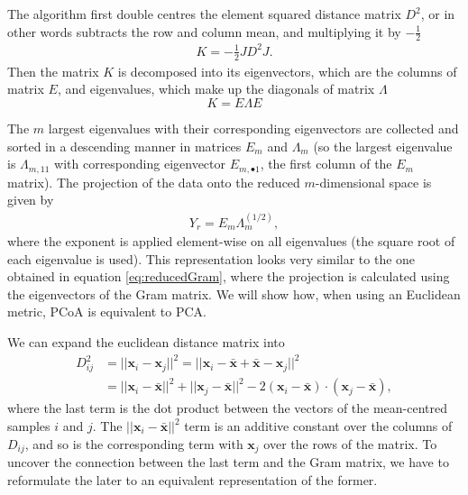 The algorithm first double centres the element squared distance matrix $D^2$, or in other words subtracts the row and column mean, and multiplying it by $-\frac{1}{2}$
\begin{align}
\label{eq:Kmatrix}
K = -\frac{1}{2}JD^2J.
\end{align}
Then the matrix $K$ is decomposed into its eigenvectors, which are the columns of matrix $E$, and eigenvalues, which make up the diagonals of matrix $\Lambda$
\begin{equation}
    K = E\Lambda E
\end{equation}

The $m$ largest eigenvalues with their corresponding eigenvectors are collected and sorted in a descending manner in matrices $E_m$ and $\Lambda_m$ (so the largest eigenvalue is $\Lambda_{m,11}$ with corresponding eigenvector $E_{m,{ \bullet}1}$, the first column of the $E_m$ matrix). The projection of the data onto the reduced $m$-dimensional space is given by
\begin{align}
Y_r = E_m \Lambda_m^{(1/2)},
\end{align}
where the exponent is applied element-wise on all eigenvalues (the square root of each eigenvalue is used). This representation looks very similar to the one obtained in equation \ref{eq:reducedGram}, where the projection is calculated using the eigenvectors of the Gram matrix. We will show how, when using an Euclidean metric, PCoA is equivalent to PCA.

We can expand the euclidean distance matrix into 
\begin{align}
D^2_{ij} &= ||\mathbf{x}_i - \mathbf{x}_j||^2 = ||\mathbf{x}_i - \mathbf{\bar{x}}+\mathbf{\bar{x}} -\mathbf{x}_j||^2   \\
&= ||\mathbf{x}_i - \mathbf{\bar{x}}||^2 + ||\mathbf{x}_j - \mathbf{\bar{x}}||^2 - 2(\mathbf{x}_i - \mathbf{\bar{x}})\cdot (\mathbf{x}_j - \mathbf{\bar{x}}),
\end{align}
where the last term is the dot product between the vectors of the mean-centred samples $i$ and $j$. The $||\mathbf{x}_i - \mathbf{\bar{x}}||^2$ term is an additive constant over the columns of $D_{ij}$, and so is the corresponding term with $\mathbf{x}_j$ over the rows of the matrix.  To uncover the connection between the last term and the Gram matrix, we have to reformulate the later to an equivalent representation of the former. 


